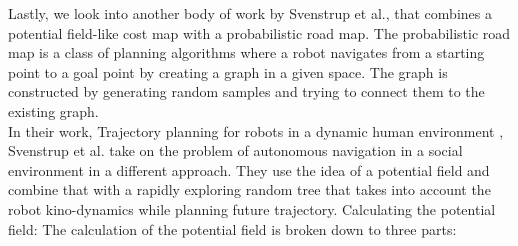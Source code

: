 Lastly, we look into another body of work by Svenstrup et al., that combines a potential field-like cost map with a probabilistic road map. The probabilistic road map is a class of planning algorithms where a robot navigates from a starting point to a goal point by creating a graph in a given space. The graph is constructed by generating random samples and trying to connect them to the existing graph.\\
In their work, Trajectory planning for robots in a dynamic human environment \cite{svenstrup_trajectory_2010}, Svenstrup et al. take on the problem of autonomous navigation in a social environment in a different approach. They use the idea of a potential field and combine that with a rapidly exploring random tree that takes into account the robot kino-dynamics while planning future trajectory.
Calculating the potential field:
The calculation of the potential field is broken down to three parts:
